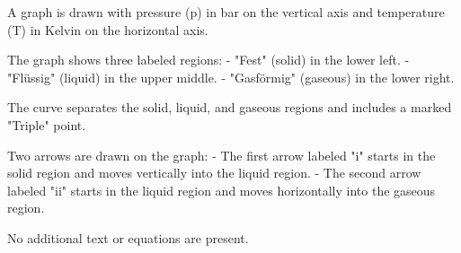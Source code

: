 A graph is drawn with pressure (p) in bar on the vertical axis and temperature (T) in Kelvin on the horizontal axis.  

The graph shows three labeled regions:  
- "Fest" (solid) in the lower left.  
- "Flüssig" (liquid) in the upper middle.  
- "Gasförmig" (gaseous) in the lower right.  

The curve separates the solid, liquid, and gaseous regions and includes a marked "Triple" point.  

Two arrows are drawn on the graph:  
- The first arrow labeled "i" starts in the solid region and moves vertically into the liquid region.  
- The second arrow labeled "ii" starts in the liquid region and moves horizontally into the gaseous region.  

No additional text or equations are present.